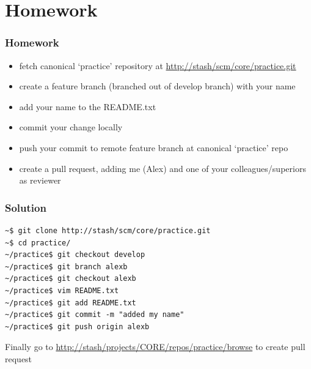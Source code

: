 \documentclass{beamer}
\begin{document}
\section{Homework}

\begin{frame}
    \frametitle{Homework}
    \begin{itemize}
        \item fetch canonical `practice' repository at \url{http://stash/scm/core/practice.git}
        \item create a feature branch (branched out of develop branch) with your name
        \item add your name to the README.txt
        \item commit your change locally
        \item push your commit to remote feature branch at canonical `practice' repo
        \item create a pull request, adding me (Alex) and one of your colleagues/superiors as reviewer
    \end{itemize}
\end{frame}

\begin{frame}[fragile]
    \frametitle{Solution}
    \begin{verbatim}
~$ git clone http://stash/scm/core/practice.git
~$ cd practice/
~/practice$ git checkout develop
~/practice$ git branch alexb
~/practice$ git checkout alexb
~/practice$ vim README.txt
~/practice$ git add README.txt
~/practice$ git commit -m "added my name"
~/practice$ git push origin alexb
    \end{verbatim}
    Finally go to \url{http://stash/projects/CORE/repos/practice/browse} to create pull request
\end{frame}
\end{document}
